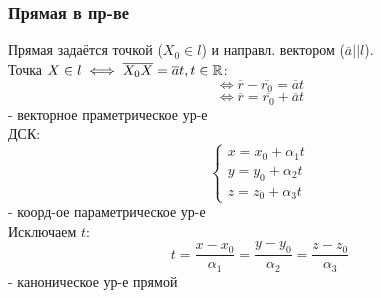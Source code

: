 \subsubsection{Прямая в пр-ве}
Прямая задаётся точкой ($X_0 \in l$) и направл. вектором ($\overline{a} || l$). \\

Точка $X \in l \iff \overline{X_0X} = \overline{a} t, t \in \mathbb{R}$:
\[
  \iff \overline{r} - \overline{r_0} = \overline{a}t
\]
\begin{equation}
  \iff \overline{r} = \overline{r_0} + \overline{a}t
\end{equation}
- векторное праметрическое ур-е \\

ДСК:
\begin{equation}
\begin{cases}
x = x_0 + \alpha_1 t \\
y = y_0 + \alpha_2 t \\
z = z_0 + \alpha_3 t
\end{cases}
\end{equation}
- коорд-ое параметрическое ур-е \\

Исключаем $t$:
\begin{equation}
t = \frac{x - x_0}{\alpha_1} = \frac{y - y_0}{\alpha_2} = \frac{z - z_0}{\alpha_3}
\end{equation}
 - каноническое ур-е прямой \\

